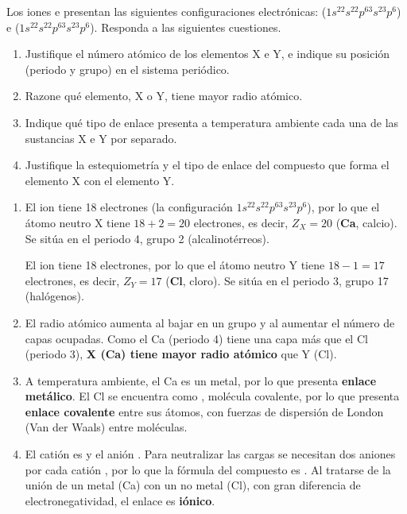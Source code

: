 \begin{exerciseEVAU}
    Los iones  e  presentan las siguientes configuraciones electrónicas:  (\( 1s^22s^22p^63s^23p^6 \)) e  (\( 1s^22s^22p^63s^23p^6 \)). Responda a las siguientes cuestiones.
    \begin{enumerate}[label=\letraminuscula]
        \item Justifique el número atómico de los elementos X e Y, e indique su posición (periodo y grupo)
        en el sistema periódico.
        \item Razone qué elemento, X o Y, tiene mayor radio atómico.
        \item Indique qué tipo de enlace presenta a temperatura ambiente cada una de las sustancias X e
        Y por separado.
        \item Justifique la estequiometría y el tipo de enlace del compuesto que forma el elemento X con
        el elemento Y.
    \end{enumerate}
    \begin{solu}
        \begin{enumerate}[label=\letraminuscula]
            \item El ion  tiene 18 electrones (la configuración \( 1s^22s^22p^63s^23p^6 \)), por lo que el átomo neutro X tiene \(18+2=20\) electrones, es decir, \(Z_X=20\) (\textbf{Ca}, calcio). Se sitúa en el periodo 4, grupo 2 (alcalinotérreos).

            El ion  tiene 18 electrones, por lo que el átomo neutro Y tiene \(18-1=17\) electrones, es decir, \(Z_Y=17\) (\textbf{Cl}, cloro). Se sitúa en el periodo 3, grupo 17 (halógenos).

            \item El radio atómico aumenta al bajar en un grupo y al aumentar el número de capas ocupadas. Como el Ca (periodo 4) tiene una capa más que el Cl (periodo 3), \textbf{X (Ca) tiene mayor radio atómico} que Y (Cl).

            \item A temperatura ambiente, el Ca es un metal, por lo que presenta \textbf{enlace metálico}. El Cl se encuentra como , molécula covalente, por lo que presenta \textbf{enlace covalente} entre sus átomos, con fuerzas de dispersión de London (Van der Waals) entre moléculas.

            \item El catión es  y el anión . Para neutralizar las cargas se necesitan dos aniones  por cada catión , por lo que la fórmula del compuesto es . Al tratarse de la unión de un metal (Ca) con un no metal (Cl), con gran diferencia de electronegatividad, el enlace es \textbf{iónico}.
        \end{enumerate}
    \end{solu}
\end{exerciseEVAU}

